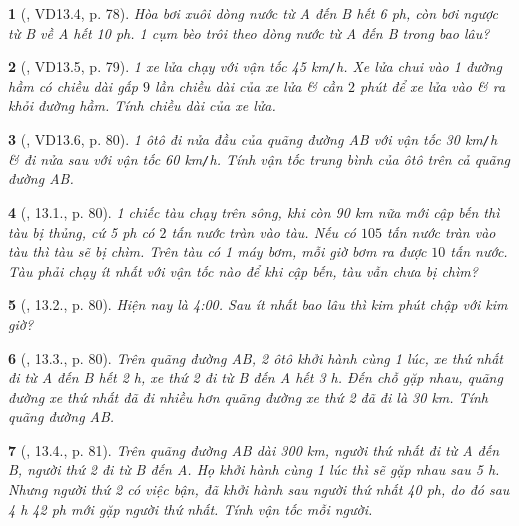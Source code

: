 \documentclass{article}
\newtheorem{baitoan}{}
\begin{document}
\begin{baitoan}[\cite{TLCT_THCS_Toan_6_so_hoc}, VD13.4, p. 78]
	Hòa bơi xuôi dòng nước từ A đến B hết {\rm6 ph}, còn bơi ngược từ B về A hết {\rm10 ph}. 1 cụm bèo trôi theo dòng nước từ A đến B trong bao lâu?
\end{baitoan}

\begin{baitoan}[\cite{TLCT_THCS_Toan_6_so_hoc}, VD13.5, p. 79]
	1 xe lửa chạy với vận tốc {\rm45 km{\tt/}h}. Xe lửa chui vào 1 đường hầm có chiều dài gấp $9$ lần chiều dài của xe lửa \& cần $2$ phút để xe lửa vào \& ra khỏi đường hầm. Tính chiều dài của xe lửa.
\end{baitoan}

\begin{baitoan}[\cite{TLCT_THCS_Toan_6_so_hoc}, VD13.6, p. 80]
	1 ôtô đi nửa đầu của quãng đường AB với vận tốc {\rm30 km{\tt/}h} \& đi nửa sau với vận tốc {\rm60 km{\tt/}h}. Tính vận tốc trung bình của ôtô trên cả quãng đường AB.
\end{baitoan}

\begin{baitoan}[\cite{TLCT_THCS_Toan_6_so_hoc}, 13.1., p. 80]
	1 chiếc tàu chạy trên sông, khi còn {\rm90 km} nữa mới cập bến thì tàu bị thủng, cứ {\rm5 ph} có $2$ tấn nước tràn vào tàu. Nếu có $105$ tấn nước tràn vào tàu thì tàu sẽ bị chìm. Trên tàu có 1 máy bơm, mỗi giờ bơm ra được $10$ tấn nước. Tàu phải chạy ít nhất với vận tốc nào để khi cập bến, tàu vẫn chưa bị chìm?
\end{baitoan}

\begin{baitoan}[\cite{TLCT_THCS_Toan_6_so_hoc}, 13.2., p. 80]
	Hiện nay là {\rm4:00}. Sau ít nhất bao lâu thì kim phút chập với kim giờ?
\end{baitoan}

\begin{baitoan}[\cite{TLCT_THCS_Toan_6_so_hoc}, 13.3., p. 80]
	Trên quãng đường AB, 2 ôtô khởi hành cùng 1 lúc, xe thứ nhất đi từ A đến B hết {\rm2 h}, xe thứ 2 đi từ B đến A hết {\rm3 h}. Đến chỗ gặp nhau, quãng đường xe thứ nhất đã đi nhiều hơn quãng đường xe thứ 2 đã đi là {\rm30 km}. Tính quãng đường AB.
\end{baitoan}

\begin{baitoan}[\cite{TLCT_THCS_Toan_6_so_hoc}, 13.4., p. 81]
	Trên quãng đường AB dài {\rm300 km}, người thứ nhất đi từ A đến B, người thứ 2 đi từ B đến A. Họ khởi hành cùng 1 lúc thì sẽ gặp nhau sau {\rm5 h}. Nhưng người thứ 2 có việc bận, đã khởi hành sau người thứ nhất {\rm40 ph}, do đó sau {\rm4 h 42 ph} mới gặp người thứ nhất. Tính vận tốc mỗi người.
\end{baitoan}
\end{document}

